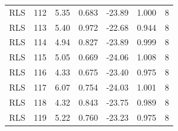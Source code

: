 \begin{longtable}{llrrrrr}
RLS & 112 & 5.35 & 0.683 & -23.89 & 1.000 & 8 \\
RLS & 113 & 5.40 & 0.972 & -22.68 & 0.944 & 8 \\
RLS & 114 & 4.94 & 0.827 & -23.89 & 0.999 & 8 \\
RLS & 115 & 5.05 & 0.669 & -24.06 & 1.008 & 8 \\
RLS & 116 & 4.33 & 0.675 & -23.40 & 0.975 & 8 \\
RLS & 117 & 6.07 & 0.754 & -24.03 & 1.001 & 8 \\
RLS & 118 & 4.32 & 0.843 & -23.75 & 0.989 & 8 \\
RLS & 119 & 5.22 & 0.760 & -23.23 & 0.975 & 8 \\
\bottomrule\end{longtable}
